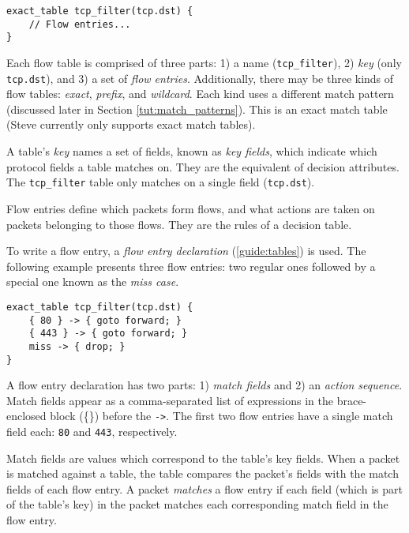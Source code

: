 \begin{codepage}
\begin{lstlisting}
exact_table tcp_filter(tcp.dst) {
	// Flow entries...
}
\end{lstlisting}
\end{codepage}

Each flow table is comprised of three parts: 
1) a name (\texttt{tcp\_filter}), 
2) \textit{key} (only \texttt{tcp.dst}), and
3) a set of \textit{flow entries}. 
Additionally, there may be three kinds of flow tables: 
\textit{exact}, \textit{prefix}, and \textit{wildcard}. 
Each kind uses a different match pattern (discussed later in Section 
\ref{tut:match_patterns}).
This is an exact match table (Steve currently only supports exact
match tables).

A table's \textit{key} names a set of fields, known as
\textit{key fields}, which indicate which protocol fields a table matches on.
They are the equivalent of decision attributes. 
The \texttt{tcp\_filter} table only matches on a single field (\texttt{tcp.dst}).

Flow entries define which packets form flows, and
what actions are taken on packets belonging to those flows.
They are the rules of a decision table.

To write a flow entry, a \textit{flow entry declaration}
(\ref{guide:tables}) is used.
The following example presents three flow entries:
two regular ones followed by a special one known as the \emph{miss case}.

\begin{codepage}
\begin{lstlisting}
exact_table tcp_filter(tcp.dst) {
	{ 80 } -> { goto forward; }
	{ 443 } -> { goto forward; }
	miss -> { drop; }
}
\end{lstlisting}
\end{codepage}

A flow entry declaration has two parts: 1) \textit{match
fields} and 2) an \textit{action sequence}. 
Match fields appear as a comma-separated list of expressions 
in the brace-enclosed block (\{\}) before the \texttt{->}. 
The first two flow entries have a single match field each: 
\texttt{80} and \texttt{443}, respectively.

Match fields are values which correspond to the table's key fields. 
When a packet is matched against a table,
the table compares the packet's fields with the match fields of each flow entry.
A packet \textit{matches} a flow entry if each field (which is part of the
table's key) in the packet matches each corresponding match field in the flow 
entry. 

